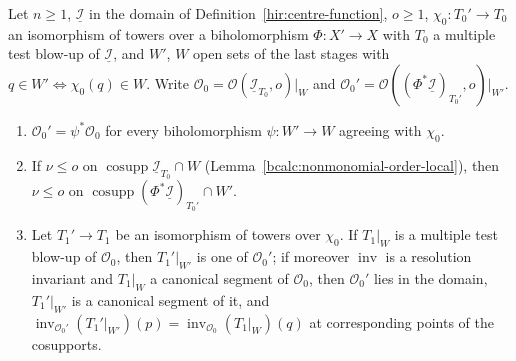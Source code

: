 \begin{lemma}
\label{bcalc:companion-tower-iso}
\mixedleanok
Let \(n\ge1\), \(\underline{\mathcal I}\) in the domain of Definition~\ref{hir:centre-function}, \(o\ge1\), \(\chi_0\colon T_0'\to T_0\) an isomorphism of towers over a
biholomorphism \(\Phi\colon X'\to X\) with \(T_0\) a multiple test blow-up of \(\underline{\mathcal I}\), and \(W'\), \(W\) open sets of the last stages with
\(q\in W'\iff\chi_0(q)\in W\). Write \(\mathcal O_0=\mathcal O(\underline{\mathcal I}_{T_0},o)|_W\) and \(\mathcal O_0'=\mathcal O((\Phi^*\underline{\mathcal I})_{T_0'},o)|_{W'}\).
\begin{enumerate}
\item \(\mathcal O_0'=\psi^*\mathcal O_0\) for every biholomorphism \(\psi\colon W'\to W\) agreeing with \(\chi_0\).
\item If \(\nu\le o\) on \(\operatorname{cosupp}\underline{\mathcal I}_{T_0}\cap W\) (Lemma~\ref{bcalc:nonmonomial-order-local}), then \(\nu\le o\) on
\(\operatorname{cosupp}(\Phi^*\underline{\mathcal I})_{T_0'}\cap W'\).
\item Let \(T_1'\to T_1\) be an isomorphism of towers over \(\chi_0\). If \(T_1|_W\) is a multiple test blow-up of \(\mathcal O_0\), then \(T_1'|_{W'}\) is one of \(\mathcal O_0'\); if
moreover \(\operatorname{inv}\) is a resolution invariant and \(T_1|_W\) a canonical segment of \(\mathcal O_0\), then \(\mathcal O_0'\) lies in the domain, \(T_1'|_{W'}\) is a
canonical segment of it, and \(\operatorname{inv}_{\mathcal O_0'}(T_1'|_{W'})(p)=\operatorname{inv}_{\mathcal O_0}(T_1|_W)(q)\) at corresponding points of the cosupports.
\end{enumerate}
\end{lemma}
